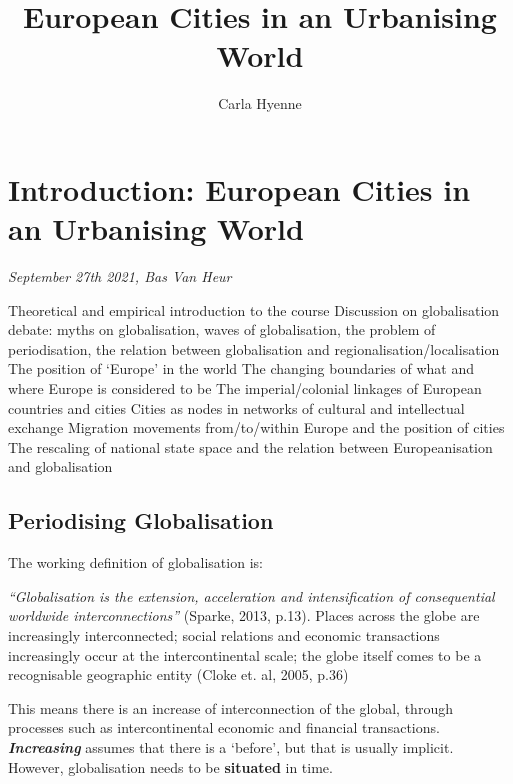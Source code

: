 \documentclass{article}
\title{European Cities in an Urbanising World}
\author{Carla Hyenne }
\begin{document}
\maketitle

\tableofcontents

\pagebreak


\section{Introduction: European Cities in an Urbanising World}
\textit{September 27th 2021, Bas Van Heur}

\begin{outline}
	\1 Theoretical and empirical introduction to the course
	\1 Discussion on globalisation debate: myths on globalisation, waves of globalisation, the problem of periodisation, the relation between globalisation and regionalisation/localisation
	\1 The position of `Europe' in the world
		\2 The changing boundaries of what and where Europe is considered to be
		\2 The imperial/colonial linkages of European countries and cities
		\2 Cities as nodes in networks of cultural and intellectual exchange
		\2 Migration movements from/to/within Europe and the position of cities
		\2 The rescaling of national state space and the relation between Europeanisation and globalisation
\end{outline}

\subsection{Periodising Globalisation}

The working definition of globalisation is:

\begin{outline}
	\1 \textit{``Globalisation is the extension, acceleration and intensification of consequential worldwide interconnections''} (Sparke, 2013, p.13). 
	\1 Places across the globe are increasingly interconnected; social relations and economic transactions increasingly occur at the intercontinental scale; the globe itself comes to be a recognisable geographic entity (Cloke et. al, 2005, p.36)
\end{outline}

This means there is an increase of interconnection of the global, through processes such as intercontinental economic and financial transactions. \textit{\textbf{Increasing}} assumes that there is a `before', but that is usually implicit. However, globalisation needs to be \textbf{situated} in time. 
\end{document}
